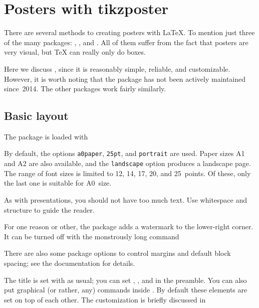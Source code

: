 \chapter{Posters with tikzposter}

There are several methods to creating posters with \LaTeX{}.
To mention just three of the many packages: , , and .
All of them suffer from the fact that posters are very visual,
but \TeX{} can really only do boxes.

Here we discuss , since it is reasonably simple, reliable, and customizable.
However, it is worth noting that the package has not been actively maintained since~2014.
The other packages work fairly similarly.


%
%
\section{Basic layout}

The package is loaded with
%
%
By default, the options \verb|a0paper|, \verb|25pt|, and \verb|portrait| are used.
Paper sizes A1 and A2 are also available, and the \verb|landscape| option produces a landscape page.
The range of font sizes is limited to 12, 14, 17, 20, and 25~points.
Of these, only the last one is suitable for A0~size.

\begin{practices}
As with presentations, you should not have too much text.
Use whitespace and structure to guide the reader.
\end{practices}

For one reason or other, the package adds a watermark to the lower-right corner.
It can be turned off with the monstrously long command
%
\begin{ExampleCode}
\tikzposterlatexaffectionproofoff
\end{ExampleCode}
%
There are also some package options to control margins and default block spacing;
see the documentation for details.

The title is set with  as usual;
you can set , , and  in the preamble.
You can also put graphical (or rather, any) commands inside .
By default these elements are set on top of each other.
The customization is briefly discussed in 



